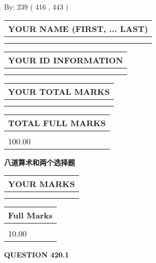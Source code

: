 \documentclass{ctexart}
\begin{document}
   
\hspace{1.0in} By: 
 239 ( 416 ,  443 )
   
   
   
   
\newpage 
\setcounter{page}{ 
   420001 } 
   
   
   
   
\noindent\begin{tabular}{|l|}
\hline
YOUR NAME (FIRST, ... LAST)  \\
\hline
 \\ 
 \\ 
\hline
\end{tabular}
\hspace{0.05in} \begin{tabular}{|l|}
\hline
 YOUR   ID   INFORMATION  \\
\hline
 \\ 
 \\ 
\hline
\end{tabular}
   
   
\vspace{0.2in}\noindent\begin{tabular}{|l|}
\hline
YOUR TOTAL MARKS  \\
\hline
 \\ 
 \\ 
\hline
\end{tabular}
\hspace{0.05in} \begin{tabular}{|l|}
\hline
TOTAL FULL MARKS  \\
\hline
 \\ 
100.00 \\
\hline
\end{tabular}
   
   
 \vspace{0.2in}
{\LARGE {\textbf{ 八道算术和两个选择题}}}
   
   
  
\vspace{0.2in}
  
\noindent\begin{tabular}{|l|}
\hline
 YOUR MARKS  \\
\hline
 \\ 
 \\ 
\hline
\end{tabular}
\hspace{0.05in} \begin{tabular}{|l|}
\hline
 Full Marks  \\
\hline
 \\ 
10.00 \\
\hline
\end{tabular}
{\textbf{\Large{QUESTION
420.1 
}}}
  
\end{document}
